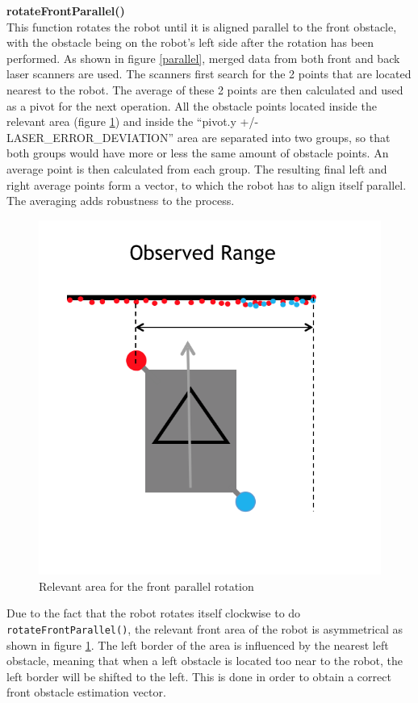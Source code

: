 \begin{description}
\item \textbf{rotateFrontParallel()} \hfill \\
This function rotates the robot until it is aligned parallel to the front obstacle, with the obstacle being on the robot's left side after the rotation has been performed. As shown in figure \ref{parallel}, merged data from both front and back laser scanners are used. The scanners first search for the 2 points that are located nearest to the robot. The average of these 2 points are then calculated and used as a pivot for the next operation. All the obstacle points located inside the relevant area (figure \ref{betrachteter_bereich}) and inside the ``pivot.y +/- LASER\_ERROR\_DEVIATION'' area are separated into two groups, so that both groups would have more or less the same amount of obstacle points. An average point is then calculated from each group. The resulting final left and right average points form a vector, to which the robot has to align itself parallel. The averaging adds robustness to the process.

\begin{figure}[htb]
\centering
\includegraphics[scale=0.8]{graphics/betrachteter_bereich.png}
\caption{Relevant area for the front parallel rotation}
\label{betrachteter_bereich}
\centering
\end{figure}

Due to the fact that the robot rotates itself clockwise to do \texttt{rotateFrontParallel()}, the relevant front area of the robot is asymmetrical as shown in figure \ref{betrachteter_bereich}. The left border of the area is influenced by the nearest left obstacle, meaning that when a left obstacle is located too near to the robot, the left border will be shifted to the left. This is done in order to obtain a correct front obstacle estimation vector.
\end{description}

